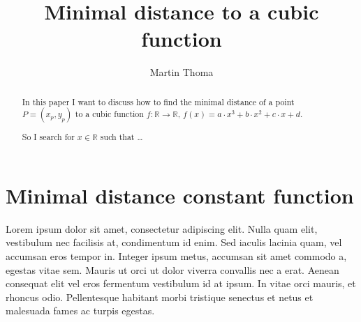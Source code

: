 \documentclass[a4paper]{scrartcl}
\title{Minimal distance to a cubic function}
\author{Martin Thoma}
\begin{document}
\maketitle
\begin{abstract}
In this paper I want to discuss how to find the minimal distance of a
point $P = (x_p, y_p)$ to a cubic function $f: \mathbb{R} \rightarrow \mathbb{R}$, 
$f(x) = a \cdot x^3 + b \cdot x^2 + c \cdot x + d$.

So I search for $x \in \mathbb{R}$ such that \dots
\end{abstract}

\section{Minimal distance constant function}
Lorem ipsum dolor sit amet, consectetur adipiscing elit. Nulla 
quam elit, vestibulum nec facilisis at, condimentum id enim. Sed 
iaculis lacinia quam, vel accumsan eros tempor in. Integer ipsum 
metus, accumsan sit amet commodo a, egestas vitae sem. Mauris ut 
orci ut dolor viverra convallis nec a erat. Aenean consequat elit 
vel eros fermentum vestibulum id at ipsum. In vitae orci mauris, et 
rhoncus odio. Pellentesque habitant morbi tristique senectus et netus 
et malesuada fames ac turpis egestas.
\end{document}
